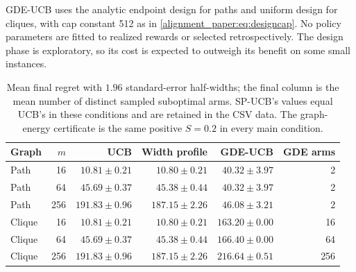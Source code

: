 GDE-UCB uses the analytic endpoint design for paths and uniform design for cliques, with cap constant 512 as in \eqref{alignment_paper:eq:designcap}. No policy parameters are fitted to realized rewards or selected retrospectively. The design phase is exploratory, so its cost is expected to outweigh its benefit on some small instances.

\begin{table}[t]
\centering\small
\begin{tabular}{lrrrrr}
\toprule
Graph & $m$ & UCB & Width profile & GDE-UCB & GDE arms\\
\midrule

Path & 16 & $10.81\pm0.21$ & $10.80\pm0.21$ & $40.32\pm3.97$ & 2 \\
Path & 64 & $45.69\pm0.37$ & $45.38\pm0.44$ & $40.32\pm3.97$ & 2 \\
Path & 256 & $191.83\pm0.96$ & $187.15\pm2.26$ & $46.08\pm3.21$ & 2 \\
Clique & 16 & $10.81\pm0.21$ & $10.80\pm0.21$ & $163.20\pm0.00$ & 16 \\
Clique & 64 & $45.69\pm0.37$ & $45.38\pm0.44$ & $166.40\pm0.00$ & 64 \\
Clique & 256 & $191.83\pm0.96$ & $187.15\pm2.26$ & $216.64\pm0.51$ & 256 \\


\bottomrule
\end{tabular}
\caption{Mean final regret with $1.96$ standard-error half-widths; the final column is the mean number of distinct sampled suboptimal arms. SP-UCB's values equal UCB's in these conditions and are retained in the CSV data. The graph-energy certificate is the same positive $S=0.2$ in every main condition.}
\label{alignment_paper:tab:geometryresults}
\end{table}

